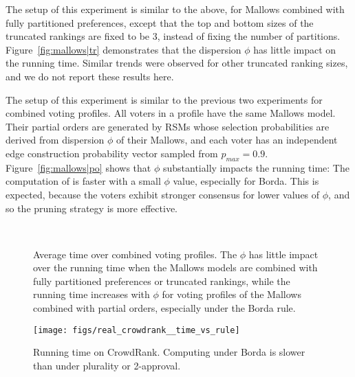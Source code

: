  The setup of this experiment is similar to the above, for Mallows combined with fully partitioned preferences, except that the top and bottom sizes of the truncated rankings are fixed to be 3, instead of fixing the number of partitions.
Figure~\ref{fig:mallows|tr} demonstrates that the dispersion $\phi$ has little impact on the running time.  Similar trends were observed for other truncated ranking sizes, and we do not report these results here.

 The setup of this experiment is similar to the previous two experiments for combined voting profiles. All voters in a profile have the same Mallows model. Their partial orders are generated by RSMs whose selection probabilities are derived from dispersion $\phi$ of their Mallows, and each voter has an independent edge construction probability vector sampled from $p_{max} = 0.9$. Figure~\ref{fig:mallows|po} shows that $\phi$ substantially impacts the running time: The computation of \mew is faster with a small $\phi$ value, especially for Borda.  This is expected, because the voters exhibit stronger consensus for lower values of $\phi$, and so the pruning strategy is more effective.

\begin{figure}[tb!]
	\centering
	\hfill
	\hfill
	~
	\caption{Average time over combined voting profiles. The $\phi$ has little impact over the running time when the Mallows models are combined with fully partitioned preferences or truncated rankings, while the running time increases with $\phi$ for voting profiles of the Mallows combined with partial orders, especially under the Borda rule. }
	\label{fig:combined}
\end{figure}


\begin{figure}[tb!]
	\centering
	\texttt{[image: figs/real\_crowdrank\_\_time\_vs\_rule]}
	\caption{Running time on CrowdRank. Computing \mew under Borda is slower than under plurality or 2-approval.}
	\label{fig:crowdrank}
\end{figure}

